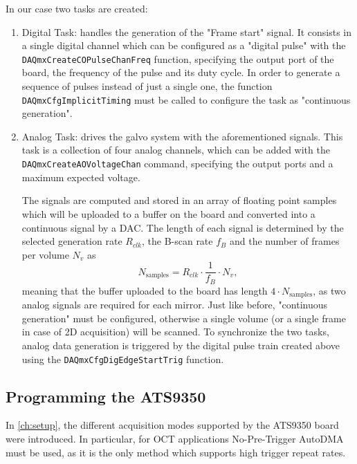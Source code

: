 In our case two tasks are created:
\begin{enumerate}
	\item Digital Task: handles the generation of the "Frame start" signal. It consists in a single digital channel which can be configured as a "digital pulse" with the \texttt{DAQmxCreateCOPulseChanFreq} function, specifying the output port of the board, the frequency of the pulse and its duty cycle. In order to generate a sequence of pulses instead of just a single one, the function \texttt{DAQmxCfgImplicit\-Timing} must be called to configure the task as "continuous generation". 


	
	\item Analog Task: drives the galvo system with the aforementioned signals. This task is a collection of four analog channels, which can be added with the \texttt{DAQmxCreateAOVoltageChan} command, specifying the output ports and a maximum expected voltage. 
	
	The signals are computed and stored in an array of floating point samples which will be uploaded to a buffer on the board and converted into a continuous signal by a \ac{DAC}. The length of each signal is determined by the selected generation rate $R_{clk}$, the B-scan rate $f_B$ and the number of frames per volume $N_v$ as 
	\begin{equation}
		N_{\text{samples}} = R_{clk} \cdot \frac{1}{f_B} \cdot N_v,
	\end{equation}
	meaning that the buffer uploaded to the board has length $4 \cdot N_{\text{samples}}$, as two analog signals are required for each mirror. Just like before, "continuous generation" must be configured, otherwise a single volume (or a single frame in case of 2D acquisition) will be scanned. To synchronize the two tasks, analog data generation is triggered by the digital pulse train created above using the \texttt{DAQmxCfgDigEdgeStartTrig} function. 
		
\end{enumerate}


\subsection{Programming the ATS9350}
In \autoref{ch:setup}, the different acquisition modes supported by the ATS9350 board were introduced. In particular, for OCT applications No-Pre-Trigger AutoDMA must be used, as it is the only method which supports high trigger repeat rates. 

